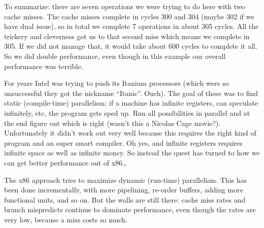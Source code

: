 \documentclass[a4paper]{report}
\begin{document}

To summarize: there are seven operations we were trying to do here with two cache misses. The cache misses complete in cycles 300 and 304 (maybe 302 if we have dual issue), so in total we complete 7 operations in about 305 cycles. All the trickery and cleverness got us to that second miss which means we complete in 305. If we did not manage that, it would take about 600 cycles to complete it all. So we did double performance, even though in this example our overall performance was terrible.
 
For years Intel was trying to push its Itanium processors (which were so unsuccessful they got the nickname ``Itanic''. Ouch). The goal of these was to find static (compile-time) parallelism: if a machine has infinite registers, can speculate infinitely, etc, the program gets sped up. Run all possibilities in parallel and at the end figure out which is right (wasn't this a Nicolas Cage movie?). Unfortunately it didn't work out very well because this requires the right kind of program and an super smart compiler. Oh yes, and infinite registers requires infinite space as well as infinite money. So instead the quest has turned to how we can get better performance out of x86\ldots

The x86 approach tries to maximize dynamic (run-time) parallelism. This has been done incrementally, with more pipelining, re-order buffers, adding more functional units, and so on. But the walls are still there: cache miss rates and branch mispredicts continue to dominate performance, even though the rates are very low, because a miss costs so much. 
\end{document}
